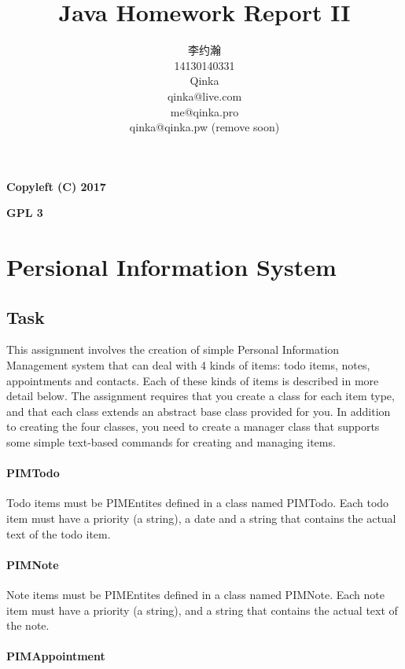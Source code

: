 \documentclass{article}
\title{Java Homework Report II}
\author{李约瀚 \\ 14130140331 \\ Qinka \\ qinka@live.com \\ me@qinka.pro \\ qinka@qinka.pw (remove soon)}
\begin{document}
\maketitle
\newpage

{\Huge \textbf{Copyleft (C) 2017}}
\par
{\Huge \textbf{GPL 3}}
\newpage

\tableofcontents
\newpage

\section{Persional Information System}
\label{sec:pim}

\subsection{Task}
\label{sec:pim:task}

This assignment involves the creation of simple Personal Information Management system that can deal with 4 kinds of items:
todo items, notes, appointments and contacts. Each of these kinds of items is described in more detail below.
The assignment requires that you create a class for each item type, and that each class extends an abstract base class provided for you.
In addition to creating the four classes, you need to create a manager class that supports some simple text-based commands
for creating and managing items.

\paragraph{PIMTodo}

Todo items must be PIMEntites defined in a class named PIMTodo. Each todo item must have a priority (a string),
a date and a string that contains the actual text of the todo item.

\paragraph{PIMNote}

Note items must be PIMEntites defined in a class named PIMNote. Each note item must have a priority (a string),
and a string that contains the actual text of the note.

\paragraph{PIMAppointment}
\end{document}
